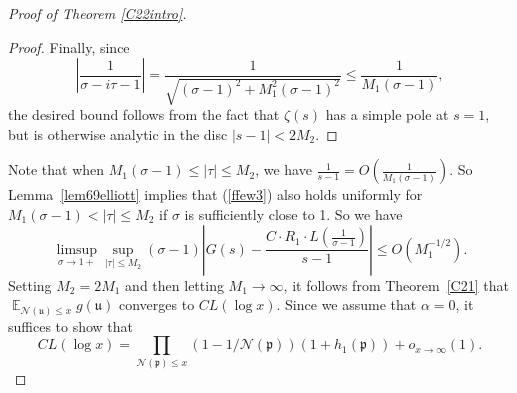 \documentclass[11pt]{amsart}
\theoremstyle{definition}
\DeclareMathOperator*{\E}{\mathbb{E}}
\newcommand{\NN}{{\mathcal N}}
\newcommand{\mf}{\mathfrak}
\newcommand{\FM}[1]{{\color{violet}{{#1}}}}
\newcommand{\WS}[1]{{\color{blue}{{#1}}}}
\begin{document}
\begin{proof}[Proof of Theorem \ref{C22intro}]
\begin{proof}
Finally, since
$$\left|\frac{1}{\sigma-i\tau-1}\right| = \frac{1}{\sqrt{(\sigma-1)^2+M_{1}^2(\sigma-1)^2}} \leq \frac{1}{M_{1}(\sigma-1)},$$
the  desired bound follows from the  fact that $\zeta(s)$ has a simple pole at $s=1$, but is otherwise analytic in the disc $|s-1|<2M_{2}$.
%

   \end{proof}

 Note that when $M_{1}(\sigma-1)\leq \vert\tau\vert\leq M_{2}$, we have $\frac{1}{s-1}=O\left(\frac{1}{M_{1}(\sigma-1)}\right)$. So  Lemma~\ref{lem69elliott} implies that  (\ref{ffew3}) also holds
   uniformly for $M_{1}(\sigma-1)<\vert\tau\vert\leq M_{2}$ if $\sigma$ is sufficiently close to 1.
So we have
   $$\limsup_{\sigma\to 1+}\sup_{\vert\tau\vert\leq M_{2}}(\sigma-1)\left| G(s)-\frac{C\cdot R_1\cdot L\left(\frac{1}{\sigma-1}\right)}{s-1}\right|\leq O(M_{1}^{-1/2}).$$
 Setting $M_{2}=2M_{1}$ and then letting $M_{1}\to\infty$,
 it  follows from Theorem~\ref{C21}  that $\E_{\NN(\mf u)\leq x}g(\mf u)$ converges to $CL(\log x)$. %
 Since we  assume that $\alpha=0$, it suffices to show that
   $$CL(\log x)=\prod_{\NN(\mf p)\leq x}(1-1/\NN(\mf p))(1+h_{1}(\mf p))+o_{x\to\infty}(1).$$


\end{proof}
\end{document}
